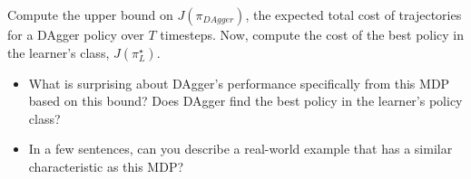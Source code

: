 \documentclass[11pt]{article}
\begin{document}
\noindent Compute the upper bound on $J(\pi_{DAgger})$, the expected total cost of trajectories for a DAgger policy over $T$ timesteps. Now, compute the cost of the best policy in the learner's class, $J(\pi^\star_{L})$. 
\begin{itemize}
\item  What is surprising about DAgger's performance specifically from this MDP based on this bound? Does DAgger find the best policy in the learner's policy class? 
\item In a few sentences, can you describe a real-world example that has a similar characteristic as this MDP? 
\end{itemize}
\end{document}
